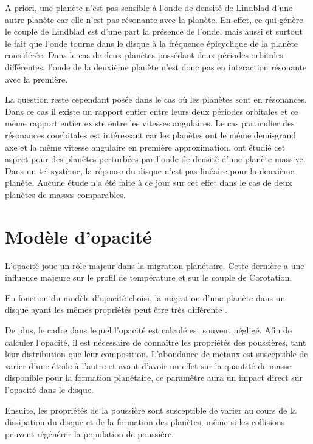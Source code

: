 A priori, une planète n'est pas sensible à l'onde de densité de Lindblad d'une autre planète car elle n'est pas résonante avec la planète. En effet, ce qui génère le couple de Lindblad est d'une part la présence de l'onde, mais aussi et surtout le fait que l'onde tourne dans le disque à la fréquence épicyclique de la planète considérée. Dans le cas de deux planètes possédant deux périodes orbitales différentes, l'onde de la deuxième planète n'est donc pas en interaction résonante avec la première. 

La question reste cependant posée dans le cas où les planètes sont en résonances. Dans ce cas il existe un rapport entier entre leurs deux périodes orbitales et ce même rapport entier existe entre les vitesses angulaires. Le cas particulier des résonances coorbitales est intéressant car les planètes ont le même demi-grand axe et la même vitesse angulaire en première approximation. \cite{podlewska2012outward, baruteau2013disk} ont étudié cet aspect pour des planètes perturbées par l'onde de densité d'une planète massive. Dans un tel système, la réponse du disque n'est pas linéaire pour la deuxième planète. Aucune étude n'a été faite à ce jour sur cet effet dans le cas de deux planètes de masses comparables.  

\section{Modèle d'opacité}
L'opacité joue un rôle majeur dans la migration planétaire. Cette dernière a une influence majeure sur le profil de température et sur le couple de Corotation. 

En fonction du modèle d'opacité choisi, la migration d'une planète dans un disque ayant les mêmes propriétés peut être très différente . 

De plus, le cadre dans lequel l'opacité est calculé est souvent négligé. Afin de calculer l'opacité, il est nécessaire de connaître les propriétés des poussières, tant leur distribution que leur composition. L'abondance de métaux est susceptible de varier d'une étoile à l'autre et avant d'avoir un effet sur la quantité de masse disponible pour la formation planétaire, ce paramètre aura un impact direct sur l'opacité dans le disque. 

Ensuite, les propriétés de la poussière sont susceptible de varier au cours de la dissipation du disque et de la formation des planètes, même si les collisions peuvent régénérer la population de poussière.

